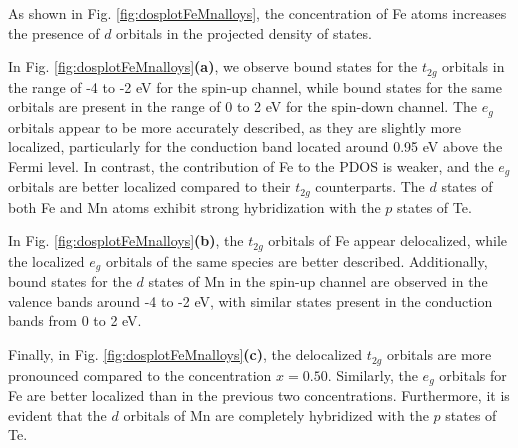 As shown in Fig. \ref{fig:dosplotFeMnalloys}, the concentration of Fe atoms increases the presence of $d$ orbitals in the projected density of states. 

In Fig. \ref{fig:dosplotFeMnalloys}\textbf{(a)}, we observe bound states for the $t_{2g}$ orbitals in the range of -4 to -2 eV for the spin-up channel, while bound states for the same orbitals are present in the range of 0 to 2 eV for the spin-down channel. The $e_{g}$ orbitals appear to be more accurately described, as they are slightly more localized, particularly for the conduction band located around 0.95 eV above the Fermi level. In contrast, the contribution of Fe to the PDOS is weaker, and the $e_{g}$ orbitals are better localized compared to their $t_{2g}$ counterparts. The $d$ states of both Fe and Mn atoms exhibit strong hybridization with the $p$ states of Te.  

In Fig. \ref{fig:dosplotFeMnalloys}\textbf{(b)}, the $t_{2g}$ orbitals of Fe appear delocalized, while the localized $e_{g}$ orbitals of the same species are better described. Additionally, bound states for the $d$ states of Mn in the spin-up channel are observed in the valence bands around -4 to -2 eV, with similar states present in the conduction bands from 0 to 2 eV.

Finally, in Fig. \ref{fig:dosplotFeMnalloys}\textbf{(c)}, the delocalized $t_{2g}$ orbitals are more pronounced compared to the concentration $x=0.50$. Similarly, the $e_{g}$ orbitals for Fe are better localized than in the previous two concentrations. Furthermore, it is evident that the $d$ orbitals of Mn are completely hybridized with the $p$ states of Te.

